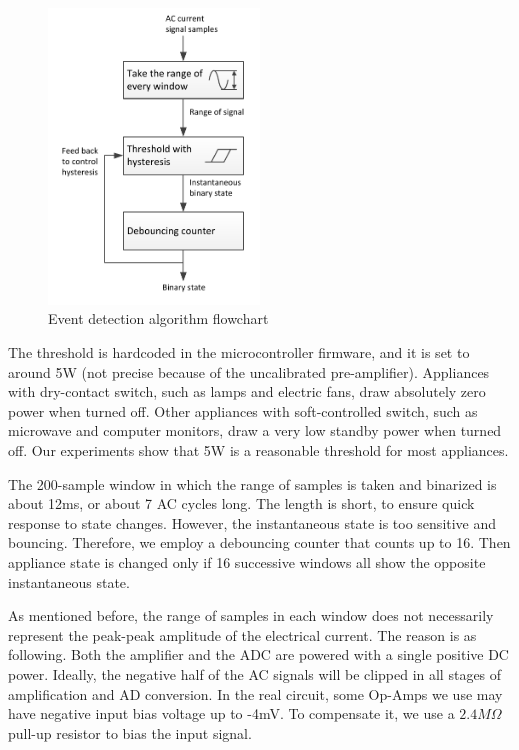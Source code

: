 \begin{figure}[htb]
  \centering
  \includegraphics[width=0.5\textwidth]{figures/eventdetect}
  \caption{Event detection algorithm flowchart}
  \label{fig:eventdetect}
\end{figure}

The threshold is hardcoded in the microcontroller firmware, and it is set to around 5W (not precise because of the uncalibrated pre-amplifier). Appliances with dry-contact switch, such as lamps and electric fans, draw absolutely zero power when turned off. Other appliances with soft-controlled switch, such as microwave and computer monitors, draw a very low standby power when turned off. Our experiments show that 5W is a reasonable threshold for most appliances. 

The 200-sample window in which the range of samples is taken and binarized is about 12ms, or about 7 AC cycles long. The length is short, to ensure quick response to state changes. However, the instantaneous state is too sensitive and bouncing. Therefore, we employ a debouncing counter that counts up to 16. Then appliance state is changed only if 16 successive windows all show the opposite instantaneous state. 

As mentioned before, the range of samples in each window does not necessarily represent the peak-peak amplitude of the electrical current. The reason is as following. Both the amplifier and the ADC are powered with a single positive DC power. Ideally, the negative half of the AC signals will be clipped in all stages of amplification and AD conversion. In the real circuit, some Op-Amps we use may have negative input bias voltage up to -4mV. To compensate it, we use a $2.4M\Omega$ pull-up resistor to bias the input signal. 

